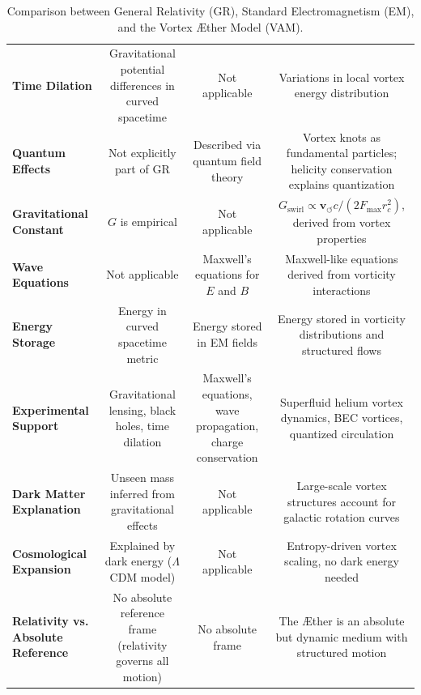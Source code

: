 \begin{landscape}
\begin{table}[htbp]
{\begin{tabular}{@{} l c c c @{}}
                \textbf{Time Dilation} & Gravitational potential differences in curved spacetime & Not applicable & Variations in local vortex energy distribution \\
                \textbf{Quantum Effects} & Not explicitly part of GR & Described via quantum field theory & Vortex knots as fundamental particles; helicity conservation explains quantization \\
                \textbf{Gravitational Constant} & $G$ is empirical & Not applicable & $G_\text{swirl} \propto \mathbf{v}_{\scriptscriptstyle\boldsymbol{\circlearrowleft}} c / (2 F_{\max} r_c^2)$, derived from vortex properties \\
                \textbf{Wave Equations} & Not applicable & Maxwell's equations for $E$ and $B$ & Maxwell-like equations derived from vorticity interactions \\
                \textbf{Energy Storage} & Energy in curved spacetime metric & Energy stored in EM fields & Energy stored in vorticity distributions and structured flows \\
                \textbf{Experimental Support} & Gravitational lensing, black holes, time dilation & Maxwell's equations, wave propagation, charge conservation & Superfluid helium vortex dynamics, BEC vortices, quantized circulation \\
                \textbf{Dark Matter Explanation} & Unseen mass inferred from gravitational effects & Not applicable & Large-scale vortex structures account for galactic rotation curves \\
                \textbf{Cosmological Expansion} & Explained by dark energy ($\Lambda$CDM model) & Not applicable & Entropy-driven vortex scaling, no dark energy needed \\
                \textbf{Relativity vs. Absolute Reference} & No absolute reference frame (relativity governs all motion) & No absolute frame & The Æther is an absolute but dynamic medium with structured motion \\
                \bottomrule
            \end{tabular}%
        }
        \caption{Comparison between General Relativity (GR), Standard Electromagnetism (EM), and the Vortex Æther Model (VAM).}
        \label{tab:comparison}
    \end{table}
\end{landscape}  %